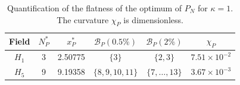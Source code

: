 \begin{table}[htbp]
\centering
\small
\caption{Quantification of the flatness of the optimum of $P_N$ for $\kappa=1$. The curvature $\chi_P$ is dimensionless.}
\label{tab:optimum-flatness}
\begin{tabular}{cccccc}
\toprule
Field & $N_P^*$ & $x_P^*$ & $\mathcal B_P(0.5\%)$ & $\mathcal B_P(2\%)$ & $\chi_P$\\
\midrule
$H_1$ & 3 & 2.50775 & $\{3\}$ & $\{2,3\}$ & $7.51\times10^{-2}$\\
$H_5$ & 9 & 9.19358 & $\{8,9,10,11\}$ & $\{7,\ldots,13\}$ & $3.67\times10^{-3}$\\
\bottomrule
\end{tabular}
\end{table}
